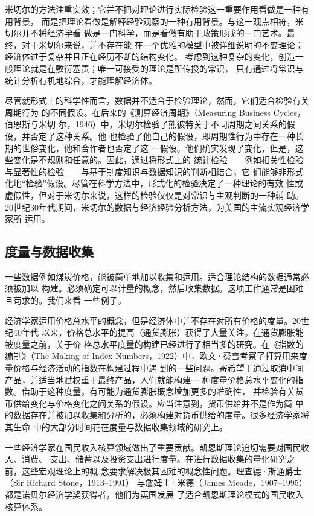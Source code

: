 米切尔的方法注重实效；它并不把对理论进行实际检验这一重要作用看做是一种有用背景，
而是把理论看做是解释经验观察的一种有用背景。与这一观点相符，米切尔并不将经济学看
做是一门科学，而是看做有助于政策形成的一门艺术。最终，对于米切尔来说，并不存在能
在一个优雅的模型中被详细说明的不变理论；经济体过于复杂并且正在经历不断的结构变化。
考虑到这种复杂的变化，创造一般理论就是在敷衍塞责；唯一可接受的理论是所传授的常识，
只有通过将常识与统计分析有机地综合，才能理解经济体。

尽管就形式上的科学性而言，数据并不适合于检验理论，然而，它们适合检验有关周期行为
的不同假设。在后来的《测算经济周期》（Measuring Business Cycles，伯恩斯与米切
尔，1946）中，米切尔检验了熊彼特关于不同周期之间关系的假设，并否定了这种关系。他
也检验了他自己的假设，即周期性行为中存在一种长期的世俗变化，他和合作者也否定了这
一假设。他们确实发现了变化，但是，这些变化是不规则和任意的。因此，通过将形式上的
统计检验——例如相关性检验与显著性的检验——与基于制度知识与数据知识的判断相结合，它
们能够非形式化地“检验”假设。尽管在科学方法中，形式化的检验决定了一种理论的有效
性或虚假性，但对于米切尔来说，这样的检验仅仅是对常识与主观判断的一种辅
助。20世纪30年代期间，米切尔的数据与经济经验分析方法，为美国的主流实观经济学家所
运用。

\subsection{度量与数据收集}

一些数据例如煤炭价格，能被简单地加以收集和运用。适合理论结构的数据通常必须被加以
构建。必须确定可以计量的概念，然后收集数据。这项工作通常是困难且苟求的。我们来看
一些例子。

经济学家运用价格总水平的概念，但是经济体中并不存在对所有价格的度量。20世纪40年代
以来，价格总水平的提高（通货膨胀）获得了大量关注。在通货膨胀能被度量之前，关于价
格总水平度量的构建已经进行了相当多的研究。在《指数的编制》（The Making of Index
Numbers，1922）中，欧文·费雪考察了打算用来度量价格与经济活动的指数在构建过程中遇
到的一些问题。寄希望于通过取消中间产品，并适当地赋权重于最终产品，人们就能构建一
种度量价格总水平变化的指数。借助于这种度量，有可能为通货膨胀概念增加更多的准确性，
并检验有关货币供给变化与价格变化之间关系的假设。应当注意到，货币供给并不是作为简
单的数据存在并被加以收集和分析的，必须构建对货币供给的度量。很多经济学家将其生命
中的大部分时间花在度量与数据收集领域的研究上。

一些经济学家在国民收入核算领域做出了重要贡献。凯恩斯理论迫切需要对国民收入、消费、
支出、储蓄以及投资支出进行度量。在进行数据收集的量化研究之前，这些宏观理论上的概
念要求解决极其困难的概念性问题。理查德·斯通爵士（Sir Richard Stone，1913--1991）
与詹姆士·米德（James Meade，1907--1995）都是诺贝尔经济学奖获得者，他们为英国发展
了适合凯恩斯理论模式的国民收入核算体系。

